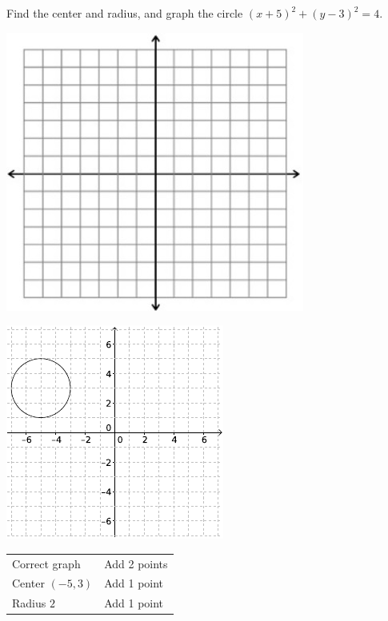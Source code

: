{
	Find the center and radius, and graph the circle $(x+5)^2+(y-3)^2=4$.\begin{onlyproblem}\begin{center}\includegraphics{fig-graphpaper.png}\end{center}\end{onlyproblem} \begin{onlysolution}\begin{center}\includegraphics{fig100-20-d-answer}\end{center}\end{onlysolution}
}
{
	\begin{tabular}{l l}
	Correct graph & Add 2 points\\
	Center $(-5, 3)$ & Add 1 point\\
	Radius $2$ & Add 1 point
	\end{tabular}
}
